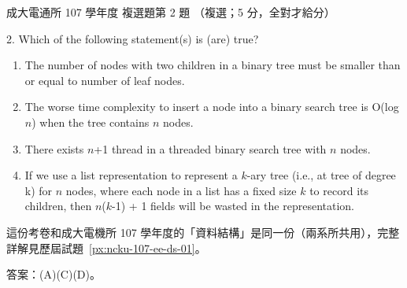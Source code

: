 \begin{pastexam}[label={px:ncku-107-cce-01}]{成大電通所 107 學年度 複選題第 2 題}
（複選；5 分，全對才給分）

2. Which of the following statement(s) is (are) true?
\begin{enumerate}[label=(\Alph*)]
\item The number of nodes with two children in a binary tree must be smaller than or equal to number of
leaf nodes.
\item The worse time complexity to insert a node into a binary search tree is O(log $n$) when the tree
contains $n$ nodes.
\item There exists $n$+1 thread in a threaded binary search tree with $n$ nodes.
\item If we use a list representation to represent a $k$-ary tree (i.e., at tree of degree k) for $n$
nodes, where each node in a list has a fixed size $k$ to record its children, then $n$($k$-1) + 1
fields will be wasted in the representation.
\end{enumerate}
\end{pastexam}

\begin{pastsoln}
這份考卷和成大電機所 107 學年度的「資料結構」是同一份（兩系所共用），完整詳解見歷屆試題~\ref{px:ncku-107-ee-ds-01}。

答案：(A)(C)(D)。
\end{pastsoln}
